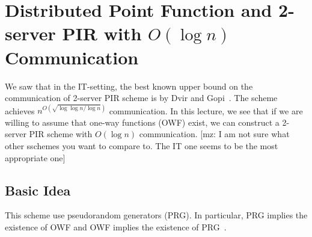 
\newcommand{\PRF}{\ensuremath{{\sf PRF}}}
\newcommand{\FHE}{\ensuremath{{\sf FHE}}}
\newcommand{\Gen}{\ensuremath{{\sf Gen}}}
\newcommand{\Eval}{\ensuremath{{\sf Eval}}}
\newcommand{\DpfGen}{\ensuremath{{\sf DPF.Gen}}}
\newcommand{\DpfEval}{\ensuremath{{\sf DPF.Eval}}}
\newcommand{\Enc}{\ensuremath{{\sf Enc}}}
\newcommand{\Dec}{\ensuremath{{\sf Dec}}}
\newcommand{\Dpf}{\ensuremath{{\sf DPF}}}
\newcommand{\DPF}{\ensuremath{{\sf DPF}}}
\newcommand{\Prg}{\ensuremath{{\sf PRG}}}
\newcommand{\Pbc}{\ensuremath{{\sf PBC}}}
\newcommand{\Seed}{\ensuremath{{\sf Seed}}}
\newcommand{\DB}{\ensuremath{{\sf DB}}}
\newcommand{\Comm}{\ensuremath{{\sf Comm}}}
\newcommand{\GenSched}{\ensuremath{{\sf GenSchedule}}}
\newcommand{\ServerPre}{\ensuremath{{\sf ServerPreprocess}}}
\newcommand{\ClientQ}{\ensuremath{{\sf ClientQuery}}}
\newcommand{\ServerA}{\ensuremath{{\sf ServerAnswer}}}
\newcommand{\ClientD}{\ensuremath{{\sf ClientDecode}}}
\newtheorem{notation}{Notation}
\newcommand{\xor}{\ensuremath{\oplus}}
\newcommand{\Sim}{\ensuremath{{\sf Sim}}}
\newcommand{\negl}{\ensuremath{{\sf negl}}}
\newcommand{\get}{\ensuremath{\leftarrow}}
\newcommand{\Client}{\textsf{Client}~}
\newcommand{\Server}{\textsf{Server}~}
\newcommand{\CV}{\ensuremath{{\sf CV}}}
\newcommand{\key}{\ensuremath{{\sf key}}}
\newcommand{\getr}{\ensuremath{~{\overset{\$}{\leftarrow}}}~}
\newcommand{\ignore}[1]{}

\newcommand{\elaine}[1]{{\color{red} [elaine: #1]}}
\newcommand{\mingxun}[1]{{\color{red} [mz: #1]}}

\section{Distributed Point Function and 2-server PIR with $O(\log{n})$ Communication ~\cite{boyle2016function}}

We saw that in the IT-setting, the best known upper bound on the communication of 2-server PIR scheme is by Dvir and Gopi~\cite{dvir20162}.
The scheme achieves $n^{O(\sqrt{\log \log n / \log n})}$ communication.
In this lecture, we see that if we are willing to assume that one-way functions (OWF) exist, we can construct a 2-server PIR scheme with $O(\log n)$ communication.
\mingxun{I am not sure what other sschemes you want to compare to. The IT one seems to be the most appropriate one}

\subsection{Basic Idea}
This scheme use pseudorandom generators (PRG). In particular, PRG implies the existence of OWF and OWF implies the existence of PRG~\cite{haastad1999pseudorandom}. 

